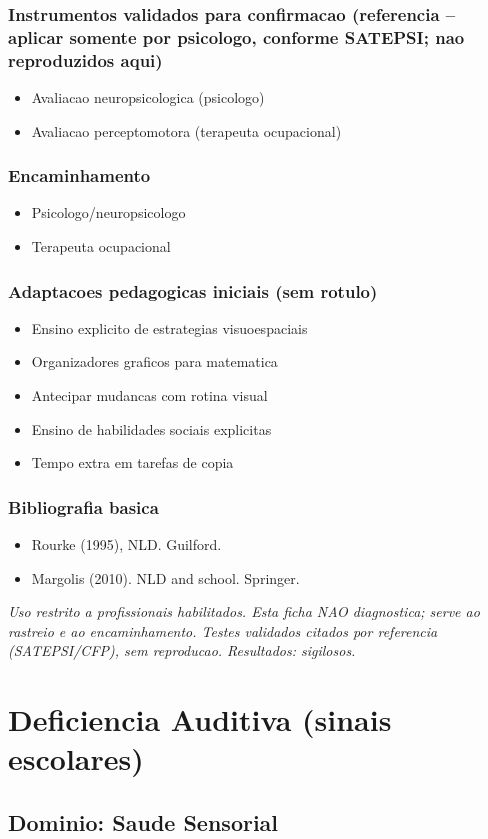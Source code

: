 \documentclass[a4paper,11pt]{book}
\newcommand{\avisolegal}{\par\medskip\noindent\footnotesize\itshape
\color{cinza}Uso restrito a profissionais habilitados. Esta ficha NAO diagnostica;
serve ao rastreio e ao encaminhamento. Testes validados citados por referencia
(SATEPSI/CFP), sem reproducao. Resultados: sigilosos.\color{black}\par}
\begin{document}
\subsection*{Instrumentos validados para confirmacao (referencia -- aplicar somente por psicologo, conforme SATEPSI; nao reproduzidos aqui)}
\begin{itemize}
\item Avaliacao neuropsicologica (psicologo)
\item Avaliacao perceptomotora (terapeuta ocupacional)
\end{itemize}
\subsection*{Encaminhamento}
\begin{itemize}
\item Psicologo/neuropsicologo
\item Terapeuta ocupacional
\end{itemize}
\subsection*{Adaptacoes pedagogicas iniciais (sem rotulo)}
\begin{itemize}
\item Ensino explicito de estrategias visuoespaciais
\item Organizadores graficos para matematica
\item Antecipar mudancas com rotina visual
\item Ensino de habilidades sociais explicitas
\item Tempo extra em tarefas de copia
\end{itemize}
\subsection*{Bibliografia basica}
\begin{itemize}
\item Rourke (1995), NLD. Guilford.
\item Margolis (2010). NLD and school. Springer.
\end{itemize}
\avisolegal


\chapter{Deficiencia Auditiva (sinais escolares)}
\section*{Dominio: Saude Sensorial}
\end{document}
